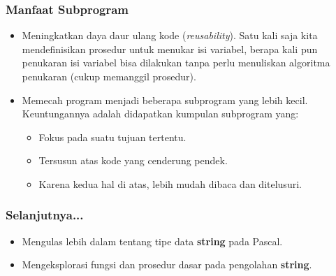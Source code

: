 \documentclass{beamer}
\begin{document}
\begin{frame}
\frametitle{Manfaat Subprogram}
\begin{itemize}
	\item Meningkatkan daya daur ulang kode (\textit{reusability}).
	\newline Satu kali saja kita mendefinisikan prosedur untuk menukar isi variabel, berapa kali pun penukaran isi variabel bisa dilakukan tanpa perlu menuliskan algoritma penukaran (cukup memanggil prosedur).
	\item Memecah program menjadi beberapa subprogram yang lebih kecil. 
	\newline Keuntungannya adalah didapatkan kumpulan subprogram yang:
	\begin{itemize}
		\item Fokus pada suatu tujuan tertentu.
		\item Tersusun atas kode yang cenderung pendek.
		\item Karena kedua hal di atas, lebih mudah dibaca dan ditelusuri.
	\end{itemize}
\end{itemize}
\end{frame}

\begin{frame}
\frametitle{Selanjutnya...}
\begin{itemize}
	\item Mengulas lebih dalam tentang tipe data \textbf{string} pada Pascal.
	\item Mengeksplorasi fungsi dan prosedur dasar pada pengolahan \textbf{string}.
\end{itemize}
\end{frame}
\end{document}
